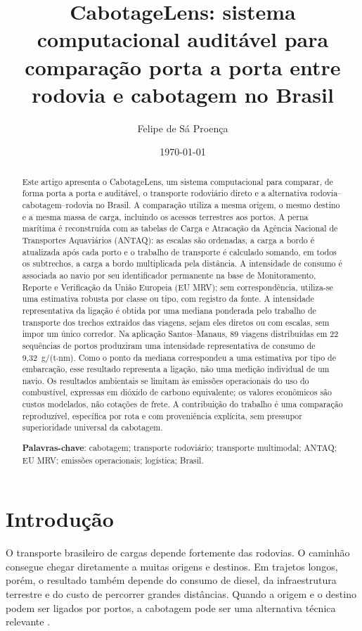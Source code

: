 \documentclass[12pt,a4paper]{article}
\title{CabotageLens: sistema computacional auditável para comparação porta a porta entre rodovia e cabotagem no Brasil}
\author{Felipe de Sá Proença}
\date{\today}
\begin{document}
\maketitle

\begin{abstract}
Este artigo apresenta o CabotageLens, um sistema computacional para comparar, de forma porta a porta e auditável, o transporte rodoviário direto e a alternativa rodovia--cabotagem--rodovia no Brasil. A comparação utiliza a mesma origem, o mesmo destino e a mesma massa de carga, incluindo os acessos terrestres aos portos. A perna marítima é reconstruída com as tabelas de Carga e Atracação da Agência Nacional de Transportes Aquaviários (ANTAQ): as escalas são ordenadas, a carga a bordo é atualizada após cada porto e o trabalho de transporte é calculado somando, em todos os subtrechos, a carga a bordo multiplicada pela distância. A intensidade de consumo é associada ao navio por seu identificador permanente na base de Monitoramento, Reporte e Verificação da União Europeia (EU MRV); sem correspondência, utiliza-se uma estimativa robusta por classe ou tipo, com registro da fonte. A intensidade representativa da ligação é obtida por uma mediana ponderada pelo trabalho de transporte dos trechos extraídos das viagens, sejam eles diretos ou com escalas, sem impor um único corredor. Na aplicação Santos--Manaus, 89 viagens distribuídas em 22 sequências de portos produziram uma intensidade representativa de consumo de 9,32~g/(t$\cdot$nm). Como o ponto da mediana correspondeu a uma estimativa por tipo de embarcação, esse resultado representa a ligação, não uma medição individual de um navio. Os resultados ambientais se limitam às emissões operacionais do uso do combustível, expressas em dióxido de carbono equivalente; os valores econômicos são custos modelados, não cotações de frete. A contribuição do trabalho é uma comparação reproduzível, específica por rota e com proveniência explícita, sem pressupor superioridade universal da cabotagem.

\textbf{Palavras-chave}: cabotagem; transporte rodoviário; transporte multimodal; ANTAQ; EU MRV; emissões operacionais; logística; Brasil.
\end{abstract}

\section{Introdução}
\label{sec:introducao}

O transporte brasileiro de cargas depende fortemente das rodovias. O caminhão consegue chegar diretamente a muitas origens e destinos. Em trajetos longos, porém, o resultado também depende do consumo de diesel, da infraestrutura terrestre e do custo de percorrer grandes distâncias. Quando a origem e o destino podem ser ligados por portos, a cabotagem pode ser uma alternativa técnica relevante \cite{icct2022}.
\end{document}
